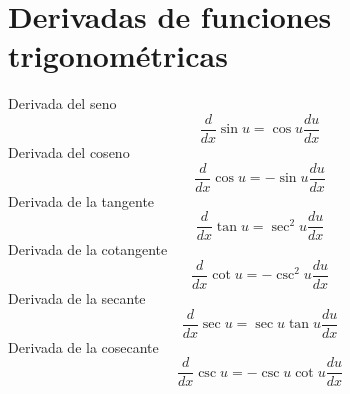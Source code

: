 \section{Derivadas de funciones trigonométricas}
Derivada del seno
\begin{equation}
	\frac{d}{dx}\sin u = \cos u \frac{du}{dx}
\end{equation}
Derivada del coseno
\begin{equation}
	\frac{d}{dx}\cos u = -\sin u \frac{du}{dx}
\end{equation}
Derivada de la tangente
\begin{equation}
	\frac{d}{dx}\tan u = \sec^2 u \frac{du}{dx}
\end{equation}
Derivada de la cotangente
\begin{equation}
	\frac{d}{dx}\cot u = -\csc^2 u \frac{du}{dx}
\end{equation}
Derivada de la secante
\begin{equation}
	\frac{d}{dx}\sec u = \sec u \tan u \frac{du}{dx}
\end{equation}
Derivada de la cosecante
\begin{equation}
	\frac{d}{dx}\csc u = -\csc u \cot u \frac{du}{dx}
\end{equation}

